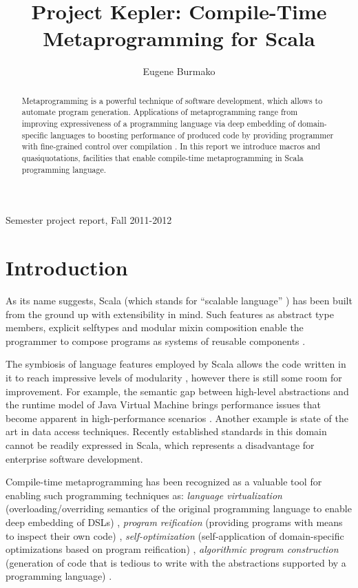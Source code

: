 \documentclass{llncs}
\begin{document}
\pagestyle{empty}
\mainmatter

\title{Project Kepler: Compile-Time Metaprogramming for Scala}
\author{Eugene Burmako}
\maketitle

\begin{center}
Semester project report, Fall 2011-2012
\end{center}

\begin{abstract}
Metaprogramming is a powerful technique of software development, which allows to
automate program generation. Applications of metaprogramming range from improving
expressiveness of a programming language via deep embedding of domain-specific languages \cite{czar04}
to boosting performance of produced code by providing programmer with fine-grained
control over compilation \cite{seefried04}. In this report we introduce macros and quasiquotations,
facilities that enable compile-time metaprogramming in Scala programming language.
\end{abstract}

\section{Introduction}

As its name suggests, Scala (which stands for ``scalable language'' \cite{odersky10}) has been built from the ground up with extensibility in mind.
Such features as abstract type members, explicit selftypes and modular mixin composition enable the programmer to compose programs
as systems of reusable components \cite{odersky05}.

The symbiosis of language features employed by Scala allows the code written in it to reach impressive
levels of modularity \cite{odersky09}, however there is still some room for improvement. For example, the semantic gap between high-level abstractions and
the runtime model of Java Virtual Machine brings performance issues that become apparent in high-performance scenarios \cite{hale11,dragos08}.
Another example is state of the art in data access techniques. Recently established standards in this domain \cite{box07}
cannot be readily expressed in Scala, which represents a disadvantage for enterprise software development.

Compile-time metaprogramming has been recognized as a valuable tool for enabling such programming techniques as:
\emph{language virtualization} (overloading/overriding semantics of the original programming language to enable deep embedding of DSLs) \cite{mccool02},
\emph{program reification} (providing programs with means to inspect their own code) \cite{skalski05,attardi01},
\emph{self-optimization} (self-application of domain-specific optimizations based on program reification) \cite{seefried04,cross02},
\emph{algorithmic program construction} (generation of code that is tedious to write with the abstractions supported by a programming language) \cite{sheard02,skalski05}.
\end{document}
